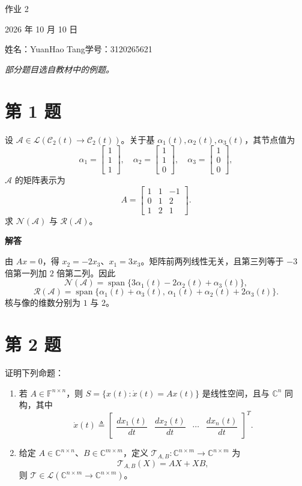 \documentclass[UTF8,10pt,letterpaper,fontset=fandol]{ctexart}
\newcommand{\C}{\mathbb C}
\newcommand{\F}{\mathbb F}
\newcommand{\Span}{\operatorname{span}}
\newcommand{\Solution}{\par\Needspace{5\baselineskip}\textbf{解答}\par}
\begin{document}
\begin{center}
{\LARGE 作业 2}\par
\vspace{0.6em}
2026 年 10 月 10 日\par
姓名：YuanHao Tang\quad 学号：3120265621
\end{center}
\begin{center}\emph{部分题目选自教材中的例题。}\end{center}

\section{第 1 题}
设 \(\mathcal A\in\mathcal L(\mathcal C_2(t)\to\mathcal C_2(t))\)。关于基
\(\alpha_1(t),\alpha_2(t),\alpha_3(t)\)，其节点值为
\[
\alpha_1=\begin{bmatrix}1\\1\\1\end{bmatrix},\quad
\alpha_2=\begin{bmatrix}1\\1\\0\end{bmatrix},\quad
\alpha_3=\begin{bmatrix}1\\0\\0\end{bmatrix},
\]
\(\mathcal A\) 的矩阵表示为
\[
A=\begin{bmatrix}1&1&-1\\0&1&2\\1&2&1\end{bmatrix}.
\]
求 \(\mathcal N(\mathcal A)\) 与 \(\mathcal R(\mathcal A)\)。

\Solution
由 \(Ax=0\)，得 \(x_2=-2x_3\)、\(x_1=3x_3\)。矩阵前两列线性无关，且第三列等于
\(-3\) 倍第一列加 \(2\) 倍第二列。因此
\[
\boxed{\mathcal N(\mathcal A)=\Span\{3\alpha_1(t)-2\alpha_2(t)+\alpha_3(t)\}},
\]
\[
\boxed{\mathcal R(\mathcal A)=\Span\{\alpha_1(t)+\alpha_3(t),\,
\alpha_1(t)+\alpha_2(t)+2\alpha_3(t)\}}.
\]
核与像的维数分别为 \(1\) 与 \(2\)。

\section{第 2 题}
证明下列命题：
\begin{enumerate}
\item 若 \(A\in\F^{n\times n}\)，则
\(S=\{x(t):\dot x(t)=Ax(t)\}\) 是线性空间，且与 \(\C^n\) 同构，其中
\[
\dot x(t)\triangleq
\begin{bmatrix}\dfrac{dx_1(t)}{dt}&\dfrac{dx_2(t)}{dt}&\cdots&\dfrac{dx_n(t)}{dt}\end{bmatrix}^{T}.
\]
\item 给定 \(A\in\C^{n\times n}\)、\(B\in\C^{m\times m}\)，定义
\(\mathcal T_{A,B}:\C^{n\times m}\to\C^{n\times m}\) 为
\[
\mathcal T_{A,B}(X)=AX+XB,
\]
则 \(\mathcal T\in\mathcal L(\C^{n\times m}\to\C^{n\times m})\)。
\end{enumerate}
\end{document}
